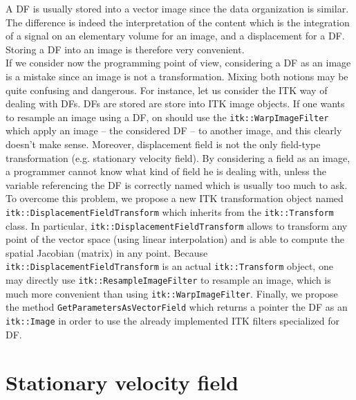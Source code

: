 A DF is usually stored into a vector image since the data organization is similar. The difference is indeed the interpretation of the content which is the integration of a signal on an elementary volume for an image, and a displacement for a DF. Storing a DF into an image is therefore very convenient.
\\
If we consider now the programming point of view, considering a DF as an image is a mistake since an image is not a transformation. Mixing both notions may be quite confusing and dangerous. For instance, let us consider the  ITK way of dealing with DFs. DFs are stored are store into ITK image objects. If one wants to resample an image using a DF, on should use the \texttt{itk::WarpImageFilter} which apply an image -- the considered DF -- to another image, and this clearly doesn't make sense. Moreover, displacement field is not the only field-type transformation (e.g. stationary velocity field). By considering a field as an image, a programmer cannot know what kind of field he is dealing with, unless the variable referencing the DF is correctly named which is usually too much to ask.
\\
To overcome this problem, we propose a new ITK transformation object named \texttt{itk::\-Displacement\-Field\-Transform} which inherits from the \texttt{itk::Transform} class. In particular, \texttt{itk::\-Displacement\-Field\-Transform} allows to transform any point of the vector space (using linear interpolation) and is able to compute the spatial Jacobian (matrix) in any point. Because \texttt{itk::\-Displacement\-Field\-Transform} is an actual \texttt{itk::Transform} object, one may directly use \texttt{itk::ResampleImageFilter} to resample an image, which is much more convenient than using \texttt{itk::WarpImageFilter}. Finally, we propose the method \texttt{GetParametersAsVectorField} which returns a pointer the DF as an \texttt{itk::Image} in order to use the already implemented ITK filters specialized for DF.



\section{Stationary velocity field}
\label{sec:transformations:svf}


